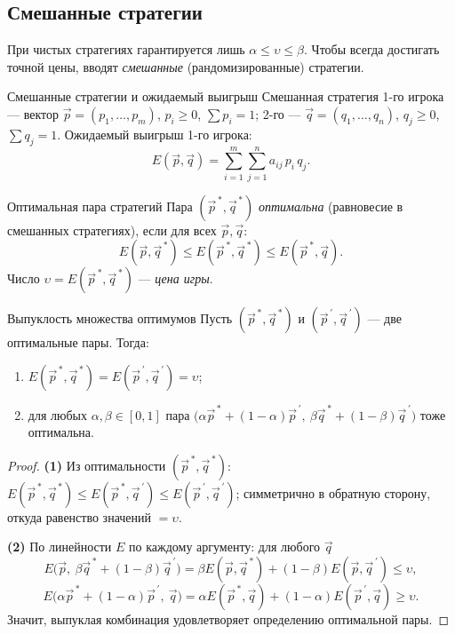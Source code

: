 \subsection{Смешанные стратегии}

При чистых стратегиях гарантируется лишь $\alpha\le\upsilon\le\beta$. Чтобы всегда достигать точной цены, вводят \emph{смешанные} (рандомизированные) стратегии.

\begin{Definition}{Смешанные стратегии и ожидаемый выигрыш}{}
	Смешанная стратегия 1-го игрока — вектор $\vec p=(p_1,\dots,p_m)$, $p_i\ge 0$, $\sum p_i=1$; 2-го — $\vec q=(q_1,\dots,q_n)$, $q_j\ge 0$, $\sum q_j=1$. Ожидаемый выигрыш 1-го игрока:
	\[
	E(\vec p,\vec q)=\sum_{i=1}^m\sum_{j=1}^n a_{ij}\,p_i\,q_j.
	\]
\end{Definition}

\begin{Definition}{Оптимальная пара стратегий}{}
	Пара $(\vec p^{\,*},\vec q^{\,*})$ \emph{оптимальна} (равновесие в смешанных стратегиях), если для всех $\vec p,\vec q$:
	\[
	E(\vec p,\vec q^{\,*})\le E(\vec p^{\,*},\vec q^{\,*})\le E(\vec p^{\,*},\vec q).
	\]
	Число $\upsilon=E(\vec p^{\,*},\vec q^{\,*})$ — \emph{цена игры}.
\end{Definition}

\begin{Statement}{Выпуклость множества оптимумов}{}
	Пусть $(\vec p^{\,*},\vec q^{\,*})$ и $(\vec p^{\,\prime},\vec q^{\,\prime})$ — две оптимальные пары. Тогда:
	\begin{enumerate}
		\item $E(\vec p^{\,*},\vec q^{\,*})=E(\vec p^{\,\prime},\vec q^{\,\prime})=\upsilon$;
		\item для любых $\alpha,\beta\in[0,1]$ пара $\bigl(\alpha\vec p^{\,*}+(1-\alpha)\vec p^{\,\prime},\ \beta\vec q^{\,*}+(1-\beta)\vec q^{\,\prime}\bigr)$ тоже оптимальна.
	\end{enumerate}
\end{Statement}

\begin{proof}
	\textbf{(1)} Из оптимальности $(\vec p^{\,*},\vec q^{\,*})$: $E(\vec p^{\,*},\vec q^{\,*})\le E(\vec p^{\,*},\vec q^{\,\prime})\le E(\vec p^{\,\prime},\vec q^{\,\prime})$; симметрично в обратную сторону, откуда равенство значений $=\upsilon$.

	\textbf{(2)} По линейности $E$ по каждому аргументу: для любого $\vec q$
	\[
	E\!\bigl(\vec p,\ \beta\vec q^{\,*}+(1-\beta)\vec q^{\,\prime}\bigr)
	=\beta E(\vec p,\vec q^{\,*})+(1-\beta)E(\vec p,\vec q^{\,\prime})\le\upsilon,
	\]
	\[
	E\!\bigl(\alpha\vec p^{\,*}+(1-\alpha)\vec p^{\,\prime},\ \vec q\bigr)
	=\alpha E(\vec p^{\,*},\vec q)+(1-\alpha)E(\vec p^{\,\prime},\vec q)\ge\upsilon.
	\]
	Значит, выпуклая комбинация удовлетворяет определению оптимальной пары.
\end{proof}

